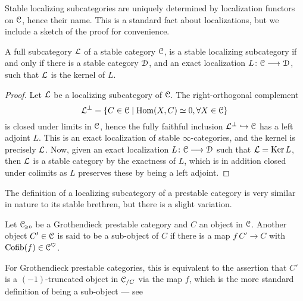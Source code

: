 Stable localizing subcategories are uniquely determined by localization functors on $\EuScript{C}$, hence their name. This is a standard fact about localizations, but we include a sketch of the proof for convenience. 

\begin{lemma}
    A full subcategory $\mathcal{L}$ of a stable category $\EuScript{C}$, is a stable localizing subcategory if and only if there is a stable category $\EuScript{D}$, and an exact localization $L\colon\EuScript{C}\longrightarrow\EuScript{D}$, such that $\mathcal{L}$ is the kernel of $L$. 
\end{lemma}
\begin{proof}
    Let $\mathcal{L}$ be a localizing subcategory of $\EuScript{C}$. The right-orthogonal complement 
    \[\mathcal{L}^\perp = \{C\in \EuScript{C} \mid \operatorname{Hom}(X, C)\simeq 0, \forall X\in \EuScript{C}\}\]
    is closed under limits in $\EuScript{C}$, hence the fully faithful inclusion $\mathcal{L}^\perp \hookrightarrow \EuScript{C}$ has a left adjoint $L$. This is an exact localization of stable $\infty$-categories, and the kernel is precisely $\mathcal{L}$. Now, given an exact localization $L\colon \EuScript{C}\longrightarrow \EuScript{D}$ such that $\mathcal{L} = \operatorname{Ker} L$, then $\mathcal{L}$ is a stable category by the exactness of $L$, which is in addition closed under colimits as $L$ preserves these by being a left adjoint. 
\end{proof}


The definition of a localizing subcategory of a prestable category is very similar in nature to its stable brethren, but there is a slight variation. 

\begin{definition}
    Let $\EuScript{C}_{\hspace{-1pt}\scriptscriptstyle\geqslant 0}$ be a Grothendieck prestable category and $C$ an object in $\EuScript{C}$. Another object $C'\in \EuScript{C}$ is said to be a sub-object of $C$ if there is a map $f\: C'\to C$ with $ \operatorname{Cofib}(f)\in \EuScript{C}^\heartsuit$. 
\end{definition}

\begin{remark}
    For Grothendieck prestable categories, this is equivalent to the assertion that $C'$ is a $(-1)$-truncated object in $\EuScript{C}_{/C}$ via the map $f$, which is the more standard definition of being a sub-object --- see \cite[C.2.3.4]{lurie_SAG}
\end{remark}

